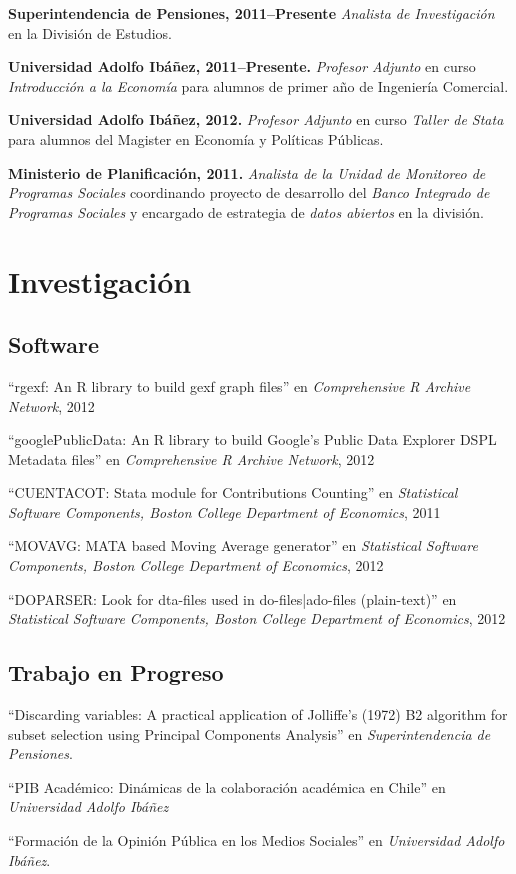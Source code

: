 \documentclass[letterpaper, 12pt]{article}
\renewenvironment{itemize}{
  \begin{list}{}{
    \setlength{\leftmargin}{0.45cm}
  }
}{
  \end{list}
}
\begin{document}
\begin{itemize}
\item \textbf{Superintendencia de Pensiones, 2011--Presente} \emph{Analista de Investigación} en la División de Estudios.
\item \textbf{Universidad Adolfo Ibáñez, 2011--Presente.} \emph{Profesor Adjunto} en curso \emph{Introducción a la Economía} para alumnos de primer año de Ingeniería Comercial.
\item \textbf{Universidad Adolfo Ibáñez, 2012.} \emph{Profesor Adjunto} en curso \emph{Taller de Stata} para alumnos del Magister en Economía y Políticas Públicas.
\item \textbf{Ministerio de Planificación, 2011.} \emph{Analista de la Unidad de Monitoreo de Programas Sociales} coordinando proyecto de desarrollo del \emph{Banco Integrado de Programas Sociales} y encargado de estrategia de \emph{datos abiertos} en la división.
\end{itemize}

\section*{Investigación}
\subsection*{Software}
\begin{itemize}
\item ``rgexf: An R library to build gexf graph files'' en {\it Comprehensive R Archive Network}, 2012
\item ``googlePublicData: An R library to build Google's Public Data Explorer DSPL Metadata files'' en {\it Comprehensive R Archive Network}, 2012
\item ``CUENTACOT: Stata module for Contributions Counting'' en {\it Statistical Software Components, Boston College Department of Economics}, 2011
\item ``MOVAVG: MATA based Moving Average generator'' en {\it Statistical Software Components, Boston College Department of Economics}, 2012
\item ``DOPARSER: Look for dta-files used in do-files|ado-files (plain-text)'' en {\it Statistical Software Components, Boston College Department of Economics}, 2012
\end{itemize}

\subsection*{Trabajo en Progreso}
\begin{itemize}
\item ``Discarding variables: A practical application of Jolliffe's (1972) B2 algorithm for subset selection using Principal Components Analysis'' en {\it Superintendencia de Pensiones}.
\item ``PIB Académico: Dinámicas de la colaboración académica en Chile'' en {\it Universidad Adolfo Ibáñez}
\item ``Formación de la Opinión Pública en los Medios Sociales'' en {\it Universidad Adolfo Ibáñez}.
\end{itemize}
\end{document}
